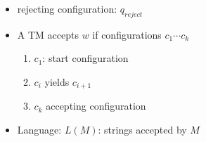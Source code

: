 \begin{frame}[allowframebreaks]
\begin{itemize}
\item rejecting configuration: $q_{reject}$
\item A TM accepts $w$ if configurations 
$c_1 \cdots c_k$
\begin{enumerate}
\item $c_1$: start configuration
\item $c_i$ yields $c_{i+1}$
\item $c_k$ accepting configuration
\end{enumerate}
\item Language: $L(M)$: strings accepted by $M$

\end{itemize}\end{frame}



